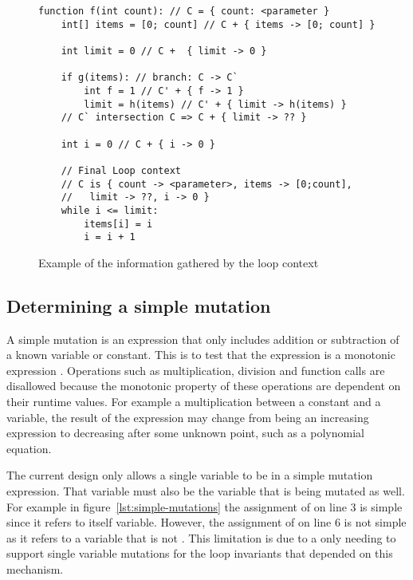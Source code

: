 \begin{figure}[ht]
\begin{lstlisting}
function f(int count): // C = { count: <parameter }
    int[] items = [0; count] // C + { items -> [0; count] }

    int limit = 0 // C +  { limit -> 0 } 

    if g(items): // branch: C -> C`
        int f = 1 // C' + { f -> 1 }
        limit = h(items) // C' + { limit -> h(items) }
    // C` intersection C => C + { limit -> ?? }

    int i = 0 // C + { i -> 0 }

    // Final Loop context
    // C is { count -> <parameter>, items -> [0;count],
    //   limit -> ??, i -> 0 }
    while i <= limit:
        items[i] = i
        i = i + 1
\end{lstlisting}
\caption{Example of the information gathered by the loop context}
\label{lst:loop-context}
\end{figure}

\subsection{Determining a simple mutation}\label{s:simple-mut}


A simple mutation is an expression that only includes addition or subtraction
of a known variable or constant.
This is to test that the expression is a monotonic expression \cite{tanton2005encyclopedia}.
Operations such as multiplication, division and function calls are disallowed
because the monotonic property of these operations are dependent on their
runtime values.
For example a multiplication between a constant and a variable,
the result of the expression may change from being an increasing expression
to decreasing after some unknown point, such as a polynomial equation.

The current design only allows a single variable to be in a simple mutation
expression.
That variable must also be the variable that is being mutated as well.
For example in figure~\ref{lst:simple-mutations} the assignment of  on
line 3 is simple since it refers to itself variable.
However, the assignment of  on line 6 is not simple as
it refers to a variable that is not .
This limitation is due to a only needing to 
support single variable mutations for the loop invariants
that depended on this mechanism.

